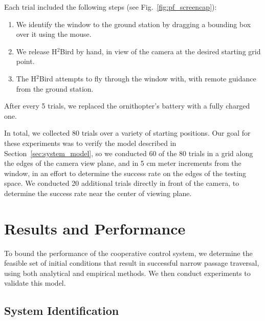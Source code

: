 \documentclass{aamas2013}
\begin{document}
Each trial included the following steps (see Fig.~\ref{fig:pf_screencap}):
\begin{enumerate}
\item We identify the window to the ground station by dragging a bounding 
box over it using the mouse. 
\item We release H$^2$Bird by hand, in view of the camera at the desired 
starting grid point.
\item The H$^2$Bird attempts to fly through the window with, with remote 
guidance from the ground station.
\end{enumerate}

After every 5 trials, we replaced the ornithopter's battery with a fully 
charged one.

In total, we collected 80 trials over a variety of starting positions. Our 
goal for these experiments was to verify the model described in 
Section~\ref{sec:system_model}, so we conducted 60 of the 80 trials in a 
grid along the edges of the camera view plane, and in 5 cm meter increments 
from the window, in an effort to determine the success rate on the edges of 
the testing space. We conducted 20 additional trials directly in front of 
the camera, to determine the success rate near the center of viewing plane. 


\section{Results and Performance}
\label{sec:performance}
To bound the performance of the cooperative control system, we determine 
the feasible set of initial conditions that result in successful narrow 
passage traversal, using both analytical and empirical methods. We then 
conduct experiments to validate this model.

\subsection{System Identification}

\end{document}
